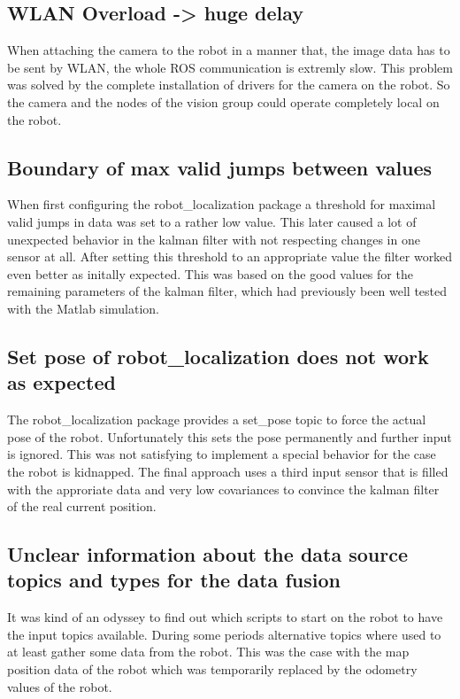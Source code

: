 \subsection{WLAN Overload -> huge delay}
When attaching the camera to the robot in a manner that, the image data has to be sent by WLAN, the whole ROS communication is extremly slow. This problem was solved by the complete installation of drivers for the camera on the robot. So the camera and the nodes of the vision group could operate completely local on the robot.
\subsection{Boundary of max valid jumps between values}
When first configuring the robot\_localization package a threshold for maximal valid jumps in data was set to a rather low value. This later caused a lot of unexpected behavior in the kalman filter with not respecting changes in one sensor at all. After setting this threshold to an appropriate value the filter worked even better as initally expected. This was based on the good values for the remaining parameters of the kalman filter, which had previously been well tested with the Matlab simulation.
\subsection{Set pose of robot\_localization does not work as expected}
The robot\_localization package provides a set\_pose topic to force the actual pose of the robot. Unfortunately this sets the pose permanently and further input is ignored. This was not satisfying to implement a special behavior for the case the robot is kidnapped. The final approach uses a third input sensor that is filled with the approriate data and very low covariances to convince the kalman filter of the real current position.
\subsection{Unclear information about the data source topics and types for the data fusion}
It was kind of an odyssey to find out which scripts to start on the robot to have the input topics available. During some periods alternative topics where used to at least gather some data from the robot. This was the case with the map position data of the robot which was temporarily replaced by the odometry values of the robot.